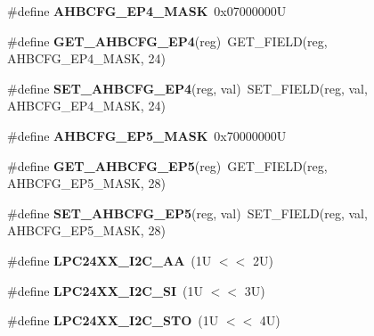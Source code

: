 \begin{DoxyCompactItemize}
\#define {\bfseries A\+H\+B\+C\+F\+G\+\_\+\+E\+P4\+\_\+\+M\+A\+SK}~0x07000000U
\item 
\mbox{\label{group__lpc24xx__regs_ga6391c596ae9b436545d0c2376f7945bb}} 
\#define {\bfseries G\+E\+T\+\_\+\+A\+H\+B\+C\+F\+G\+\_\+\+E\+P4}(reg)~G\+E\+T\+\_\+\+F\+I\+E\+LD(reg, A\+H\+B\+C\+F\+G\+\_\+\+E\+P4\+\_\+\+M\+A\+SK, 24)
\item 
\mbox{\label{group__lpc24xx__regs_gaf91db5fb9bd870eae4bacff96f180e10}} 
\#define {\bfseries S\+E\+T\+\_\+\+A\+H\+B\+C\+F\+G\+\_\+\+E\+P4}(reg,  val)~S\+E\+T\+\_\+\+F\+I\+E\+LD(reg, val, A\+H\+B\+C\+F\+G\+\_\+\+E\+P4\+\_\+\+M\+A\+SK, 24)
\item 
\mbox{\label{group__lpc24xx__regs_ga1a3575294ac7b90f1ddcd422aa30f1c7}} 
\#define {\bfseries A\+H\+B\+C\+F\+G\+\_\+\+E\+P5\+\_\+\+M\+A\+SK}~0x70000000U
\item 
\mbox{\label{group__lpc24xx__regs_ga1d7ba827120080609bc78b7dae334d19}} 
\#define {\bfseries G\+E\+T\+\_\+\+A\+H\+B\+C\+F\+G\+\_\+\+E\+P5}(reg)~G\+E\+T\+\_\+\+F\+I\+E\+LD(reg, A\+H\+B\+C\+F\+G\+\_\+\+E\+P5\+\_\+\+M\+A\+SK, 28)
\item 
\mbox{\label{group__lpc24xx__regs_gad4c6c0f319554cd4bdd901b49a1b5dd5}} 
\#define {\bfseries S\+E\+T\+\_\+\+A\+H\+B\+C\+F\+G\+\_\+\+E\+P5}(reg,  val)~S\+E\+T\+\_\+\+F\+I\+E\+LD(reg, val, A\+H\+B\+C\+F\+G\+\_\+\+E\+P5\+\_\+\+M\+A\+SK, 28)
\item 
\mbox{\label{group__lpc24xx__regs_ga395aa0b9262412c5b9454ae4b7094d3f}} 
\#define {\bfseries L\+P\+C24\+X\+X\+\_\+\+I2\+C\+\_\+\+AA}~(1\+U $<$$<$ 2\+U)
\item 
\mbox{\label{group__lpc24xx__regs_gaed99e422015751ebb2ab8606f3bd2f30}} 
\#define {\bfseries L\+P\+C24\+X\+X\+\_\+\+I2\+C\+\_\+\+SI}~(1\+U $<$$<$ 3\+U)
\item 
\mbox{\label{group__lpc24xx__regs_gaed131eaad0956c1ccc72475f575a7453}} 
\#define {\bfseries L\+P\+C24\+X\+X\+\_\+\+I2\+C\+\_\+\+S\+TO}~(1\+U $<$$<$ 4\+U)
\item 
\mbox{\label{group__lpc24xx__regs_ga9f1454e088630d7d4d2cf6d6a50f5802}} 
$$
\end{DoxyCompactItemize}

